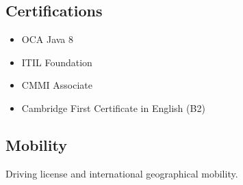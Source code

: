\documentclass[letterpaper]{twentysecondcv} %
\begin{document}
\subsection{Certifications}
\begin{itemize}
\item OCA Java 8
\item ITIL Foundation
\item CMMI Associate
\item Cambridge First Certificate in English (B2)
\end{itemize}
\subsection{Mobility}
Driving license and international geographical mobility.







\end{document}
